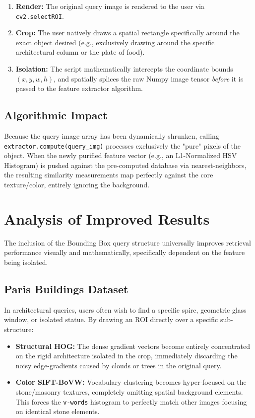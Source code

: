 \documentclass[11pt, a4paper]{article}
\begin{document}
\begin{enumerate}
    \item \textbf{Render:} The original query image is rendered to the user via \texttt{cv2.selectROI}.
    \item \textbf{Crop:} The user natively draws a spatial rectangle specifically around the exact object desired (e.g., exclusively drawing around the specific architectural column or the plate of food).
    \item \textbf{Isolation:} The script mathematically intercepts the coordinate bounds $(x, y, w, h)$, and spatially splices the raw Numpy image tensor \textit{before} it is passed to the feature extractor algorithm.
\end{enumerate}

\subsection{Algorithmic Impact}
Because the query image array has been dynamically shrunken, calling \texttt{extractor.compute(query\_img)} processes exclusively the "pure" pixels of the object. When the newly purified feature vector (e.g., an L1-Normalized HSV Histogram) is pushed against the pre-computed database via nearest-neighbors, the resulting similarity measurements map perfectly against the core texture/color, entirely ignoring the background.

\section{Analysis of Improved Results}

The inclusion of the Bounding Box query structure universally improves retrieval performance visually and mathematically, specifically dependent on the feature being isolated.

\subsection{Paris Buildings Dataset}
In architectural queries, users often wish to find a specific spire, geometric glass window, or isolated statue. By drawing an ROI directly over a specific sub-structure:
\begin{itemize}
    \item \textbf{Structural HOG:} The dense gradient vectors become entirely concentrated on the rigid architecture isolated in the crop, immediately discarding the noisy edge-gradients caused by clouds or trees in the original query.
    \item \textbf{Color SIFT-BoVW:} Vocabulary clustering becomes hyper-focused on the stone/masonry textures, completely omitting spatial background elements. This forces the \texttt{v-words} histogram to perfectly match other images focusing on identical stone elements.
\end{itemize}
\end{document}
